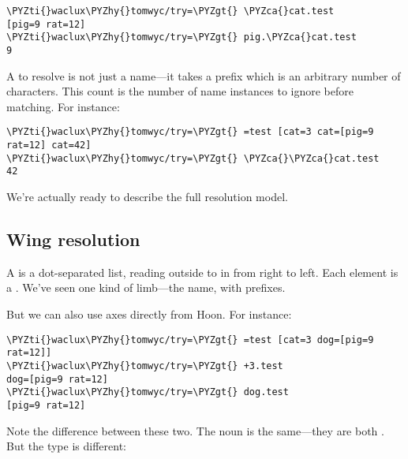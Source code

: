 \begin{framed_shaded}
\begin{Verbatim}[fontsize=\relsize{-2.5},fontseries=b,commandchars=\\\{\}]
\PYZti{}waclux\PYZhy{}tomwyc/try=\PYZgt{} \PYZca{}cat.test
[pig=9 rat=12]
\PYZti{}waclux\PYZhy{}tomwyc/try=\PYZgt{} pig.\PYZca{}cat.test
9
\end{Verbatim}
\end{framed_shaded}
A  to resolve is not just a name---it takes a prefix which
is an arbitrary number of \kode{\ket } characters.  This count is the
number of name instances to ignore before matching.  For
instance: 

\begin{framed_shaded}
\begin{Verbatim}[fontsize=\relsize{-2.5},fontseries=b,commandchars=\\\{\}]
\PYZti{}waclux\PYZhy{}tomwyc/try=\PYZgt{} =test [cat=3 cat=[pig=9 rat=12] cat=42]
\PYZti{}waclux\PYZhy{}tomwyc/try=\PYZgt{} \PYZca{}\PYZca{}cat.test
42
\end{Verbatim}
\end{framed_shaded}
We're actually ready to describe the full resolution model.

\subsection{Wing resolution}

A  is a dot-separated list, reading outside to in from
right to left.  Each element is a .  We've seen one kind of
limb---the name, with \kode{\ket } prefixes.

But we can also use axes directly from Hoon.  For instance:

\begin{framed_shaded}
\begin{Verbatim}[fontsize=\relsize{-2.5},fontseries=b,commandchars=\\\{\}]
\PYZti{}waclux\PYZhy{}tomwyc/try=\PYZgt{} =test [cat=3 dog=[pig=9 rat=12]]
\PYZti{}waclux\PYZhy{}tomwyc/try=\PYZgt{} +3.test
dog=[pig=9 rat=12]
\PYZti{}waclux\PYZhy{}tomwyc/try=\PYZgt{} dog.test
[pig=9 rat=12]
\end{Verbatim}
\end{framed_shaded}
Note the difference between these two.  The noun is the same---they are both \kode{[9 12]}.  But the type is different:


